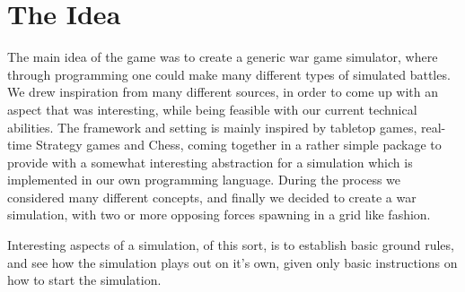 \section{The Idea}
	The main idea of the game was to create a generic war game simulator, where through programming one could make many different types of 
	simulated battles. We drew inspiration from many different sources, 
	in order to come up with an aspect that was interesting, while being feasible with our current technical abilities.
	The framework and setting is mainly inspired by tabletop games, real-time Strategy games and Chess, 
	coming together in a rather simple package to provide with a somewhat 
	interesting abstraction for a simulation which is implemented in our own programming language.
	During the process we considered many different concepts, 
	and finally we decided to create a war simulation, with two or more opposing forces 
	spawning in a grid like fashion. 
	
	Interesting aspects of a simulation, of this sort, is to establish basic ground rules, 
	and see how the simulation plays out on it's own, given only basic instructions on how to start the simulation.